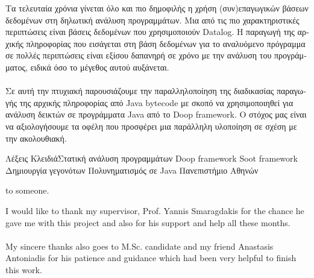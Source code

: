 \documentclass{dithesis}
\begin{document}
\begin{otherlanguage}{greek}
\begin{thesisabstract}[ΠΕΡΙΛΗΨΗ]
    Τα τελευταία χρόνια γίνεται όλο και πιο δημοφιλής η χρήση (συν)επαγωγικών βάσεων δεδομένων στη δηλωτική ανάλυση προγραμμάτων. Μια από τις πιο χαρακτηριστικές περιπτώσεις είναι βάσεις δεδομένων που χρησιμοποιούν Datalog. Η παραγωγή της αρχικής πληροφορίας που εισάγεται στη βάση δεδομένων για το αναλυόμενο πρόγραμμα σε πολλές περιπτώσεις είναι εξίσου δαπανηρή σε χρόνο με την ανάλυση του προγράμματος, ειδικά όσο το μέγεθος αυτού αυξάνεται. \\
    \\
    Σε αυτή την πτυχιακή παρουσιάζουμε την παραλληλοποίηση της διαδικασίας παραγωγής της αρχικής πληροφορίας από Java bytecode με σκοπό να χρησιμοποιηθεί για ανάλυση δεικτών σε προγράμματα Java από το Doop framework. Ο στόχος μας είναι να αξιολογήσουμε τα οφέλη που προσφέρει μια παράλληλη υλοποίηση σε σχέση με την ακολουθιακή.

                {Λέξεις Κλειδιά}{Στατική ανάλυση προγραμμάτων}
                                {Doop framework}
                                {Soot framework}
                                {Δημιουργία γεγονότων}
                                {Πολυνηματισμός σε Java}
                                {Πανεπιστήμιο Αθηνών}
\end{thesisabstract}
\end{otherlanguage}

\begin{thesisdedication}
to someone.
\end{thesisdedication}

\begin{thesisacknowledgments}[Acknowledgments]
    I would like to thank my supervisor, Prof. Yannis Smaragdakis for the chance he gave me with this project and also for his support and help all these months.
    \\
    \\
    My sincere thanks also goes to M.Sc. candidate and my friend Anastasis Antoniadis for his patience and guidance which had been very helpful to finish this work.
\end{thesisacknowledgments}

\renewcommand\contentsname{Contents}
\renewcommand\listfigurename{List of Figures}
\renewcommand\listtablename{List of Tables}
\renewcommand{\figurename}{Figure}
\renewcommand{\cftfigpresnum}{Figure }
\renewcommand{\tablename}{Table}
\renewcommand{\cfttabpresnum}{Table }
\end{document}

